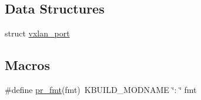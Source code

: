 \subsection*{Data Structures}
\begin{DoxyCompactItemize}
\item 
struct \hyperlink{structvxlan__port}{vxlan\+\_\+port}
\end{DoxyCompactItemize}
\subsection*{Macros}
\begin{DoxyCompactItemize}
\item 
\#define \hyperlink{vport-vxlan_8c_a1f8c165bf4196327bc3abff648276d92}{pr\+\_\+fmt}(fmt)~K\+B\+U\+I\+L\+D\+\_\+\+M\+O\+D\+N\+A\+M\+E \char`\"{}\+: \char`\"{} fmt
\end{DoxyCompactItemize}

